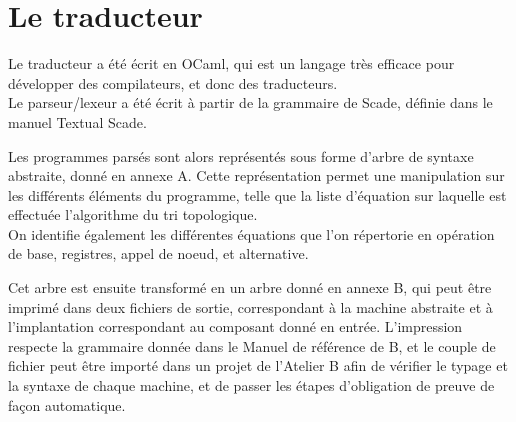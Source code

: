 \section{Le traducteur}

Le traducteur a été écrit en OCaml, qui est un langage très efficace
pour développer des compilateurs, et donc des traducteurs.\\
Le parseur/lexeur a été écrit à partir de la grammaire de Scade,
définie dans le manuel Textual Scade.

Les programmes parsés sont alors représentés sous forme d'arbre de
syntaxe abstraite, donné en annexe A. Cette représentation permet une
manipulation sur les différents éléments du programme, telle que la
liste d'équation sur laquelle est effectuée l'algorithme du tri
topologique. \\
On identifie également les différentes équations que l'on
répertorie en opération de base, registres, appel de noeud, et
alternative.

Cet arbre est ensuite transformé en un arbre donné en annexe B,
qui peut être imprimé dans deux fichiers de sortie, correspondant à
la machine abstraite et à l'implantation correspondant au composant
donné en entrée. L'impression respecte la grammaire donnée dans le
Manuel de référence de B, et le couple de fichier peut être importé
dans un projet de l'Atelier B afin de vérifier le typage et la syntaxe
de chaque machine, et de passer les étapes d'obligation de preuve de
façon automatique.
